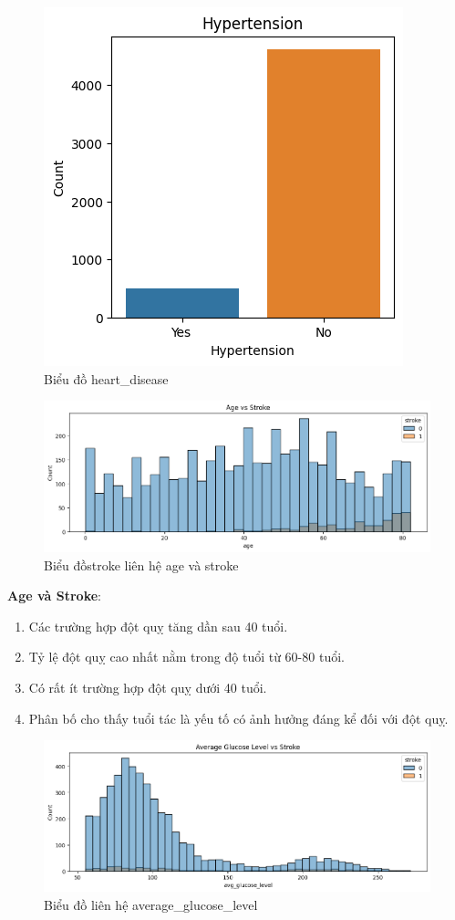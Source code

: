 \documentclass[11pt]{article}
\begin{document}
	\begin{figure}[H]
		\centering
		\includegraphics[width=0.5\linewidth]{hypertensionChart}
		\caption{Biểu đồ heart\_disease}
		\label{fig:hypertensionchart}
	\end{figure}
	
	\begin{figure}[H]
		\centering
		\includegraphics[width=1.0\linewidth]{ageAndStroke}
		\caption{Biểu đồstroke liên hệ age và stroke}
		\label{fig:ageandstroke}
	\end{figure}
	
	\textbf{Age và Stroke}:
	\begin{enumerate}
		\item Các trường hợp đột quỵ tăng dần sau 40 tuổi.
		\item Tỷ lệ đột quỵ cao nhất nằm trong độ tuổi từ 60-80 tuổi.
		\item Có rất ít trường hợp đột quỵ dưới 40 tuổi.
		\item Phân bố cho thấy tuổi tác là yếu tố có ảnh hưởng đáng kể đối với đột quỵ.
	\end{enumerate}
	
	
	\begin{figure}[H]
		\centering
		\includegraphics[width=1.0\linewidth]{glucoseAndStroke}
		\caption{Biểu đồ liên hệ average\_glucose\_level}
		\label{fig:glucoseandstroke}
	\end{figure}
	
\end{document}
